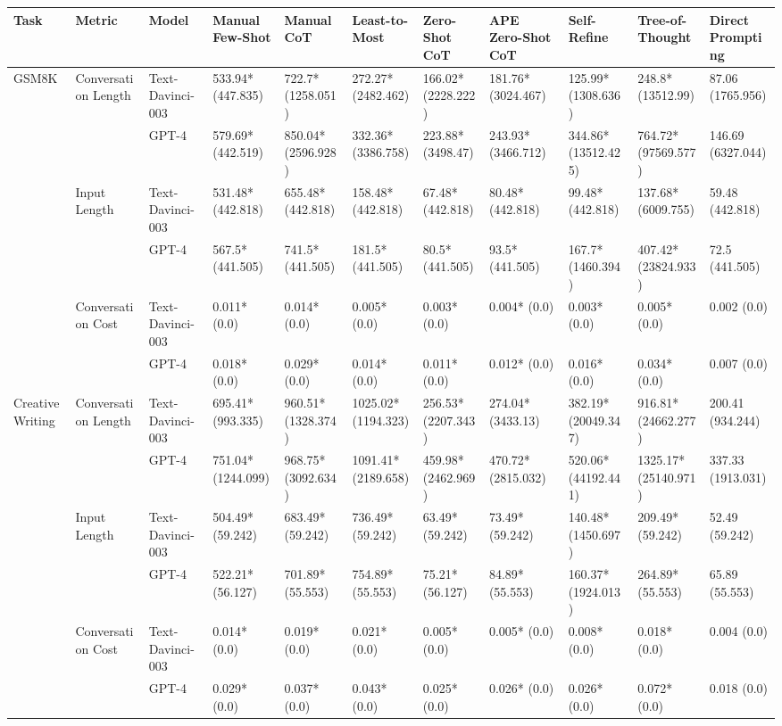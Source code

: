 \begin{tabular}{x{0.75cm}|x{1.5cm}|x{0.75cm}|x{0.75cm}|x{0.75cm}|x{0.75cm}|x{0.75cm}|x{0.75cm}|x{0.75cm}|x{0.75cm}|x{0.75cm}}
\toprule
\hline
Task & Metric & Model & Manual Few-Shot & Manual CoT & Least-to-Most & Zero-Shot CoT & APE Zero-Shot CoT & Self-Refine & Tree-of-Thought & Direct Prompting \\
\hline
\midrule
GSM8K & Conversation Length & Text-Davinci-003 & 533.94* (447.835) & 722.7* (1258.051) & 272.27* (2482.462) & 166.02* (2228.222) & 181.76* (3024.467) & 125.99* (1308.636) & 248.8* (13512.99) & 87.06 (1765.956) \\
\hline
 &  & GPT-4 & 579.69* (442.519) & 850.04* (2596.928) & 332.36* (3386.758) & 223.88* (3498.47) & 243.93* (3466.712) & 344.86* (13512.425) & 764.72* (97569.577) & 146.69 (6327.044) \\
\hline
 & Input Length & Text-Davinci-003 & 531.48* (442.818) & 655.48* (442.818) & 158.48* (442.818) & 67.48* (442.818) & 80.48* (442.818) & 99.48* (442.818) & 137.68* (6009.755) & 59.48 (442.818) \\
\hline
 &  & GPT-4 & 567.5* (441.505) & 741.5* (441.505) & 181.5* (441.505) & 80.5* (441.505) & 93.5* (441.505) & 167.7* (1460.394) & 407.42* (23824.933) & 72.5 (441.505) \\
\hline
 & Conversation Cost & Text-Davinci-003 & 0.011* (0.0) & 0.014* (0.0) & 0.005* (0.0) & 0.003* (0.0) & 0.004* (0.0) & 0.003* (0.0) & 0.005* (0.0) & 0.002 (0.0) \\
\hline
 &  & GPT-4 & 0.018* (0.0) & 0.029* (0.0) & 0.014* (0.0) & 0.011* (0.0) & 0.012* (0.0) & 0.016* (0.0) & 0.034* (0.0) & 0.007 (0.0) \\
\hline
Creative Writing & Conversation Length & Text-Davinci-003 & 695.41* (993.335) & 960.51* (1328.374) & 1025.02* (1194.323) & 256.53* (2207.343) & 274.04* (3433.13) & 382.19* (20049.347) & 916.81* (24662.277) & 200.41 (934.244) \\
\hline
 &  & GPT-4 & 751.04* (1244.099) & 968.75* (3092.634) & 1091.41* (2189.658) & 459.98* (2462.969) & 470.72* (2815.032) & 520.06* (44192.441) & 1325.17* (25140.971) & 337.33 (1913.031) \\
\hline
 & Input Length & Text-Davinci-003 & 504.49* (59.242) & 683.49* (59.242) & 736.49* (59.242) & 63.49* (59.242) & 73.49* (59.242) & 140.48* (1450.697) & 209.49* (59.242) & 52.49 (59.242) \\
\hline
 &  & GPT-4 & 522.21* (56.127) & 701.89* (55.553) & 754.89* (55.553) & 75.21* (56.127) & 84.89* (55.553) & 160.37* (1924.013) & 264.89* (55.553) & 65.89 (55.553) \\
\hline
 & Conversation Cost & Text-Davinci-003 & 0.014* (0.0) & 0.019* (0.0) & 0.021* (0.0) & 0.005* (0.0) & 0.005* (0.0) & 0.008* (0.0) & 0.018* (0.0) & 0.004 (0.0) \\
\hline
 &  & GPT-4 & 0.029* (0.0) & 0.037* (0.0) & 0.043* (0.0) & 0.025* (0.0) & 0.026* (0.0) & 0.026* (0.0) & 0.072* (0.0) & 0.018 (0.0) \\
\hline
\bottomrule
\end{tabular}
